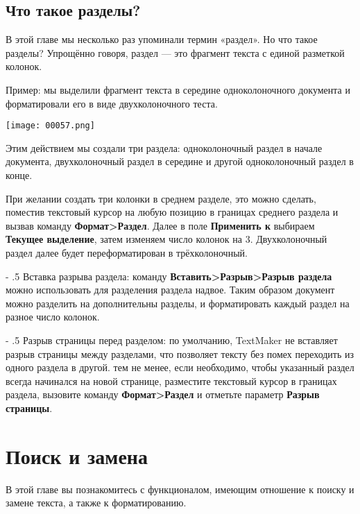 \documentclass[a4paper,10pt]{article}
\makeatletter
\renewcommand\paragraph{%
   \@startsection{paragraph}{4}{0mm}%
      {-\baselineskip}%
      {.5\baselineskip}%
      {\normalfont\normalsize\bfseries}}
\makeatother
\begin{document}
\subsection{Что такое разделы?}
В  этой главе мы несколько раз упоминали термин «раздел». Но что такое разделы? Упрощённо говоря, раздел --- это фрагмент текста с единой разметкой колонок. 

Пример: мы выделили фрагмент текста в середине одноколоночного документа и форматировали его в виде двухколоночного теста.

\texttt{[image: 00057.png]}

Этим действием мы создали три раздела: одноколоночный раздел в начале документа, двухколоночный раздел в середине и другой одноколоночный раздел в конце.

При желании создать три колонки в среднем разделе, это можно сделать, поместив текстовый курсор на любую позицию в границах среднего раздела и вызвав команду \textbf{Формат>Раздел}. Далее в поле \textbf{Применить к} выбираем \textbf{Текущее выделение}, затем изменяем число колонок на 3. Двухколоночный раздел далее будет переформатирован в трёхколоночный.

\paragraph{Вставка разрыва раздела:} команду \textbf{Вставить>Разрыв>Разрыв раздела} можно использовать для разделения раздела надвое. Таким образом документ можно разделить на дополнительны разделы, и форматировать каждый раздел на разное число колонок.

\paragraph{Разрыв страницы перед разделом:} по умолчанию, TextMaker не вставляет разрыв страницы между разделами, что позволяет тексту без помех переходить из одного раздела в другой. тем не менее, если необходимо, чтобы указанный раздел всегда начинался на новой странице, разместите текстовый курсор в границах раздела, вызовите команду \textbf{Формат>Раздел} и отметьте параметр \textbf{Разрыв страницы}.


\section{Поиск и замена}
В этой главе вы познакомитесь с функционалом, имеющим отношение к поиску и замене текста, а также к форматированию.
\end{document}
